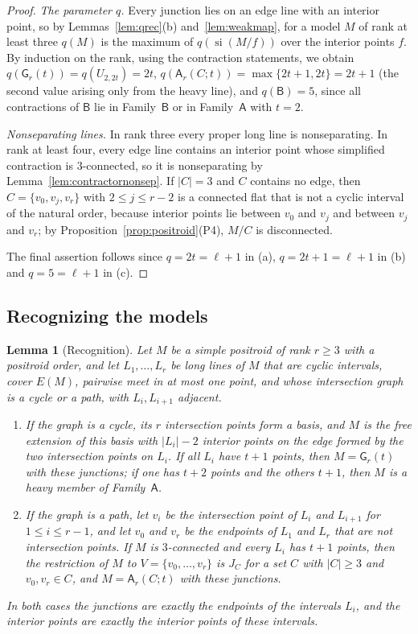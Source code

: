 \documentclass[11pt]{amsart}
\newtheorem{lemma}[theorem]{Lemma}
\theoremstyle{definition}
\theoremstyle{remark}
\numberwithin{equation}{section}
\newcommand{\si}{\operatorname{si}}
\newcommand{\GW}{\mathsf{G}}
\newcommand{\FA}{\mathsf{A}}
\newcommand{\FB}{\mathsf{B}}
\begin{document}
\begin{proof}
\emph{The parameter $q$.} Every junction lies on an edge line with an interior point, so by Lemmas~\ref{lem:qrec}(b) and~\ref{lem:weakmap}, for a model $M$ of rank at least three $q(M)$ is the maximum of $q(\si(M/f))$ over the interior points $f$. By induction on the rank, using the contraction statements, we obtain $q(\GW_r(t))=q(U_{2,2t})=2t$, $q(\FA_r(C;t))=\max\{2t+1,2t\}=2t+1$ (the second value arising only from the heavy line), and $q(\FB)=5$, since all contractions of $\FB$ lie in Family~$\FB$ or in Family~$\FA$ with $t=2$.

\emph{Nonseparating lines.} In rank three every proper long line is nonseparating. In rank at least four, every edge line contains an interior point whose simplified contraction is $3$-connected, so it is nonseparating by Lemma~\ref{lem:contractornonsep}. If $|C|=3$ and $C$ contains no edge, then $C=\{v_0,v_j,v_r\}$ with $2\le j\le r-2$ is a connected flat that is not a cyclic interval of the natural order, because interior points lie between $v_0$ and $v_j$ and between $v_j$ and $v_r$; by Proposition~\ref{prop:positroid}(P4), $M/C$ is disconnected.

The final assertion follows since $q=2t=\ell+1$ in (a), $q=2t+1=\ell+1$ in (b) and $q=5=\ell+1$ in (c).
\end{proof}

\subsection{Recognizing the models}

\begin{lemma}[Recognition]\label{lem:recognition}
Let $M$ be a simple positroid of rank $r\ge3$ with a positroid order, and let $L_1,\dots,L_r$ be long lines of $M$ that are cyclic intervals, cover $E(M)$, pairwise meet in at most one point, and whose intersection graph is a cycle or a path, with $L_i,L_{i+1}$ adjacent.
\begin{enumerate}[label=\textup{(\alph*)}]
\item If the graph is a cycle, its $r$ intersection points form a basis, and $M$ is the free extension of this basis with $|L_i|-2$ interior points on the edge formed by the two intersection points on $L_i$. If all $L_i$ have $t+1$ points, then $M=\GW_r(t)$ with these junctions; if one has $t+2$ points and the others $t+1$, then $M$ is a heavy member of Family~$\FA$.
\item If the graph is a path, let $v_i$ be the intersection point of $L_i$ and $L_{i+1}$ for $1\le i\le r-1$, and let $v_0$ and $v_r$ be the endpoints of $L_1$ and $L_r$ that are not intersection points. If $M$ is $3$-connected and every $L_i$ has $t+1$ points, then the restriction of $M$ to $V=\{v_0,\dots,v_r\}$ is $J_C$ for a set $C$ with $|C|\ge3$ and $v_0,v_r\in C$, and $M=\FA_r(C;t)$ with these junctions.
\end{enumerate}
In both cases the junctions are exactly the endpoints of the intervals $L_i$, and the interior points are exactly the interior points of these intervals.
\end{lemma}
\end{document}
